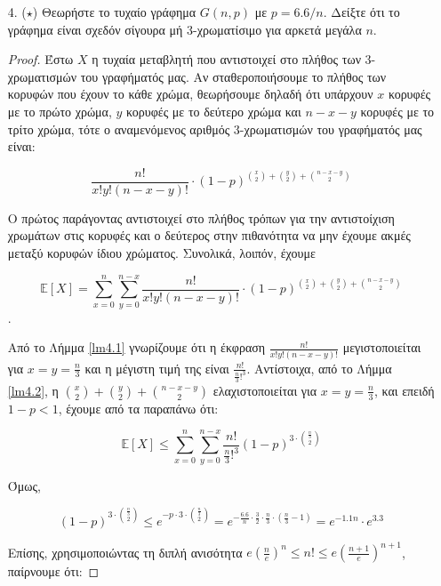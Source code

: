 \documentclass[a4paper, oneside, 11pt]{article}
\theoremstyle{definition}
\newcommand{\pr}{\mathbb{P}}
\newcommand{\ex}{\mathbb{E}}
\begin{document}
\begin{enumerate}
\begin{proof}


   \end{proof}

\item[4. ($\star$)]
   Θεωρήστε το τυχαίο γράφημα $G(n, p)$ με $p = 6.6/n$. Δείξτε ότι το γράφημα
   είναι σχεδόν σίγουρα μή 3-χρωματίσιμο για αρκετά μεγάλα $n$.

   \begin{proof}
Έστω $X$ η τυχαία μεταβλητή που αντιστοιχεί στο πλήθος των 3-χρωματισμών του γραφήματός μας. Αν σταθεροποιήσουμε το πλήθος των κορυφών που έχουν το κάθε χρώμα, θεωρήσουμε δηλαδή ότι υπάρχουν $x$ κορυφές
με το πρώτο χρώμα, $y$ κορυφές με το δεύτερο χρώμα και $n-x-y$ κορυφές με το τρίτο χρώμα, τότε ο αναμενόμενος αριθμός 3-χρωματισμών του γραφήματός μας είναι:

\[ \frac{n!}{x!y!(n-x-y)!} \cdot 
(1-p)^{{x \choose 2} + {y\choose 2} + {n-x-y\choose 2}}\]

Ο πρώτος παράγοντας αντιστοιχεί στο πλήθος τρόπων για την αντιστοίχιση χρωμάτων στις κορυφές και ο δεύτερος στην πιθανότητα να μην έχουμε ακμές
μεταξύ κορυφών ίδιου χρώματος. Συνολικά, λοιπόν, έχουμε

\[ \ex[X] = \sum_{x=0}^{n} \sum_{y=0}^{n-x} \frac{n!}{x!y!(n-x-y)!}\cdot (1-p)^{{x\choose 2}+{y\choose 2}+{n-x-y\choose 2}}\].

Από το Λήμμα \ref{lm4.1} γνωρίζουμε ότι η έκφραση $\frac{n!}{x!y!(n-x-y)!}$ μεγιστοποιείται για $x=y=\frac{n}{3}$ και η μέγιστη τιμή της είναι $\frac{n!}{\frac{n}{3}!^3}$. Αντίστοιχα, 
από το Λήμμα \ref{lm4.2},
η ${{x \choose 2} + {y\choose 2} + {n-x-y\choose 2}}$ 
ελαχιστοποιείται για $x=y=\frac{n}{3}$, και επειδή $1-p<1$, έχουμε από τα παραπάνω ότι:

\[ \ex[X] \leq \sum_{x=0}^{n}\sum_{y=0}^{n-x} \frac{n!}{\frac{n}{3}!^3} (1-p)^{3\cdot {\frac{n}{3}\choose 2}} \]

Όμως,

\[ (1-p)^{3\cdot {\frac{n}{3}\choose 2}}\leq e^{-p\cdot {3\cdot {\frac{n}{3}\choose 2}}}=e^{-\frac{6.6}{n}\cdot {\frac{3}{2}\cdot \frac{n}{3}\cdot (\frac{n}{3}-1)}}=e^{-1.1n}\cdot e^{3.3} \]

Επίσης, χρησιμοποιώντας τη διπλή ανισότητα $e(\frac{n}{e})^n \leq n! \leq e(\frac{n+1}{e})^{n+1}$, παίρνουμε ότι:


\end{proof}
\end{enumerate}
\end{document}
